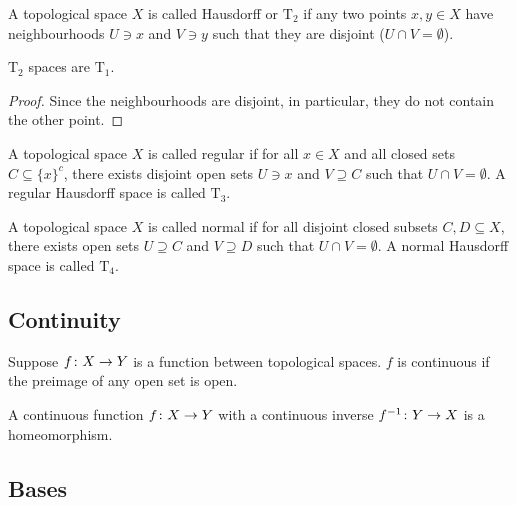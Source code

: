 \begin{definition}
    A topological space \(X\) is called Hausdorff or \(\text{T}_2\)
    if any two points \(x,y \in X\) have neighbourhoods \(U \ni x\) and \(V \ni y\)
    such that they are disjoint (\(U \cap V = \emptyset\)).
\end{definition}
\begin{lemma}
    \(\text{T}_2\) spaces are \(\text{T}_1\).
\end{lemma}
\begin{proof}
    Since the neighbourhoods are disjoint, in particular, they do not contain the other point.
\end{proof}

\begin{definition}
    A topological space \(X\) is called regular if for all \(x \in X\) and all closed sets \(C \subseteq {\{x\}}^c\),
    there exists disjoint open sets \(U \ni x\) and \(V \supseteq C\) such that \(U \cap V = \emptyset\).
    A regular Hausdorff space is called \(\text{T}_3\).
\end{definition}

\begin{definition}
    A topological space \(X\) is called normal if for all disjoint closed subsets \(C,D \subseteq X\),
    there exists open sets \(U \supseteq C\) and \(V \supseteq D\) such that \(U \cap V = \emptyset\).
    A normal Hausdorff space is called \(\text{T}_4\).
\end{definition}

\subsection*{Continuity}

\begin{definition}
    Suppose \(f\colon X\to Y\) is a function between topological spaces.
    \(f\) is continuous if the preimage of any open set is open.
\end{definition}
\begin{definition}
    A continuous function \(f\colon X\to Y\) with a continuous inverse \(f^{-1}\colon Y\to X\) is a homeomorphism.
\end{definition}

\subsection*{Bases}

